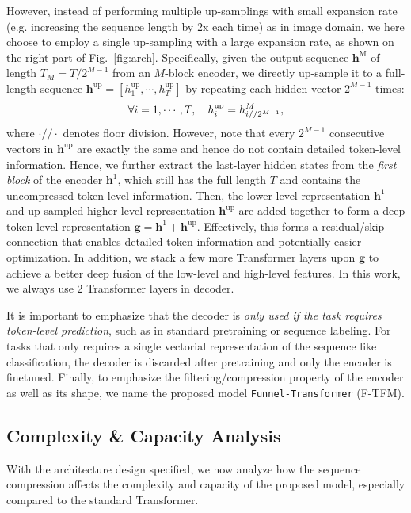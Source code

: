 \documentclass{article}
\theoremstyle{custom}
\newcommand{\mb}[1]{\boldsymbol{\mathbf{#1}}}
\newcommand{\seq}[1]{\left[ {#1} \right]}
\begin{document}
However, instead of performing multiple up-samplings with small expansion rate (e.g. increasing the sequence length by 2x each time) as in image domain, we here choose to employ a single up-sampling with a large expansion rate, as shown on the right part of Fig.~\ref{fig:arch}.
Specifically, given the output sequence $\mb{h}^\text{M}$ of length $T_M = T / 2^{M-1}$ from an $M$-block encoder, we directly up-sample it to a full-length sequence $\mb{h}^\text{up} = \seq{h^\text{up}_1, \cdots, h^\text{up}_T}$ by repeating each hidden vector $2^{M-1}$ times:\vspace{-0.25em}
\begin{align}
\label{eqn:upsample}
\forall i = 1, \cdots, T,\quad h^\text{up}_i = h^M_{i//2^{M-1}},\vspace{-0.25em}
\end{align}
where $\cdot//\cdot$ denotes floor division.
However, note that every $2^{M-1}$ consecutive vectors in $\mb{h}^\text{up}$ are exactly the same and hence do not contain detailed token-level information.
Hence, we further extract the last-layer hidden states from the \textit{first block} of the encoder $\mb{h}^{1}$, which still has the full length $T$ and contains the uncompressed token-level information.
Then, the lower-level representation $\mb{h}^{1}$ and up-sampled higher-level representation $\mb{h}^\text{up}$ are added together to form a deep token-level representation $\mb{g} = \mb{h}^{1} + \mb{h}^\text{up}$.
Effectively, this forms a residual/skip connection that enables detailed token information and potentially easier optimization.
In addition, we stack a few more Transformer layers upon $\mb{g}$ to achieve a better deep fusion of the low-level and high-level features.
In this work, we always use 2 Transformer layers in decoder.

It is important to emphasize that the decoder is \textit{only used if the task requires token-level prediction}, such as in standard pretraining or sequence labeling.
For tasks that only requires a single vectorial representation of the sequence like classification, the decoder is discarded after pretraining and only the encoder is finetuned.
Finally, to emphasize the filtering/compression property of the encoder as well as its shape, we name the proposed model \texttt{Funnel-Transformer} (F-TFM).

\subsection{Complexity \& Capacity Analysis}
\label{sec:analysis}
With the architecture design specified, we now analyze how the sequence compression affects the complexity and capacity of the proposed model, especially  compared to the standard Transformer.
\end{document}
